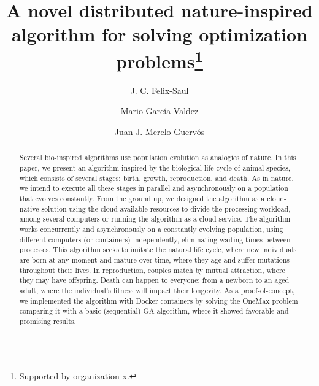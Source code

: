 \documentclass[runningheads]{llncs}
\begin{document}
%
\title{A novel distributed nature-inspired algorithm for solving optimization problems\thanks{Supported by organization x.}}
%
%
\author{J. C. Felix-Saul  \and
Mario García Valdez \and
Juan J. Merelo Guervós}
%
%
%
\maketitle              %
%
\begin{abstract}

Several bio-inspired algorithms use population evolution as analogies of
nature. In this paper, we present an algorithm inspired by the biological
life-cycle of animal species, which consists of several stages: birth, growth,
reproduction, and death. As in nature, we intend to execute all these stages in
parallel and asynchronously on a population that evolves constantly. From the
ground up, we designed the algorithm as a cloud-native solution using the cloud
available resources to divide the processing workload, among several computers
or running the algorithm as a cloud service. The algorithm works concurrently
and asynchronously on a constantly evolving population, using different
computers (or containers) independently, eliminating waiting times between
processes. This algorithm seeks to imitate the natural life cycle, where new
individuals are born at any moment and mature over time, where they age and
suffer mutations throughout their lives. In reproduction, couples match by
mutual attraction, where they may have offspring. Death can happen to everyone:
from a newborn to an aged adult, where the individual's fitness will impact
their longevity. As a proof-of-concept, we implemented the algorithm with
Docker containers by solving the OneMax problem comparing it with a basic
(sequential) GA algorithm, where it showed favorable and promising results.

\end{abstract}
\end{document}
